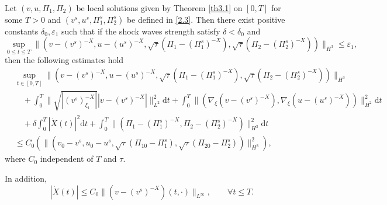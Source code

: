 \documentclass[10pt,a4paper]{amsart}
\newcommand{\dif}{\mathrm{d}}
\begin{document}
\begin{prop}\label{p1}
Let $(v, u, \Pi_1, \Pi_2)$ be local solutions given by Theorem \ref{th3.1} on $[0,T]$ for some $T>0$ and $( v^s,  u^s, \Pi^s_1, \Pi^s_{2})$ be defined in \eqref{2.3}. Then there exist positive constants $\delta_0,\varepsilon_1$ such that if the shock waves strength satisfy $\delta<\delta_0$ and
\begin{equation}\label{3.4}
\sup_{0\le t\le T} \|(v-(v^s)^{-X}, u-(u^s)^{-X}, \sqrt{\tau}(\Pi_1-(\Pi^s_1)^{-X}), \sqrt{\tau}(\Pi_2-(\Pi^s_2)^{-X}))\|_{H^3}\leq\varepsilon_1,
\end{equation}
then the following estimates hold
\begin{equation}\label{3.5}
\begin{aligned}
&\sup\limits_{t\in[0, T]}\|(v-(v^s)^{-X}, u-(u^s)^{-X}, \sqrt{\tau}(\Pi_1-(\Pi^s_1)^{-X}), \sqrt{\tau}(\Pi_2-(\Pi^s_2)^{-X}))\|_{H^3}\\
&\quad+\int_0^{T}\|\sqrt{|(v^s)^{-X}_{\xi_1}|}|v-(v^s)^{-X}|\|_{L^2}^2\dif t
+\int_0^{T}\|\left(\nabla_\xi(v-(v^s)^{-X}),\nabla_\xi (u-(u^s)^{-X})\right)\|^2_{H^2}\dif t
\\
&\quad+\delta\int_0^{T}|\dot X(t)|^2\dif t
+\int_0^{T}\|(\Pi_1-(\Pi_1^s)^{-X}, \Pi_2-(\Pi_2^s)^{-X})\|^2_{H^3}\dif t\\
&\leq C_0\left(\|(v_0-v^s, u_0-u^s, \sqrt{\tau}(\Pi_{10}-\Pi_1^s), \sqrt{\tau}(\Pi_{20}-\Pi_2^s))\|^2_{H^3}\right),
\end{aligned}
\end{equation}
where $C_0$ independent of $T$ and $\tau$.

In addition, 
\begin{equation}\label{3.6}
|\dot{X}(t)|\leq C_0\|(v-(v^s)^{-X})(t,\cdot)\|_{L^{\infty}},\qquad\forall t\leq T.
\end{equation}
\end{prop}
\end{document}
